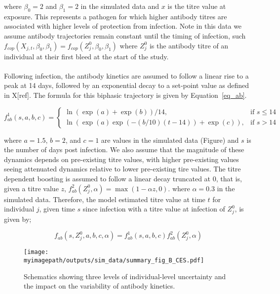 where $\beta_0 = 2$ and $\beta_1 = 2$ in the simulated data and $x$ is the titre value at exposure. This represents a pathogen for which higher antibody titres are associated with higher levels of protection from infection. Note in this data we assume antibody trajectories remain constant until the timing of infection, such $f_{cop}(X_{j, t}, \beta_0, \beta_1) = f_{cop}(Z^0_{j}, \beta_0, \beta_1)$ where $Z^0_{j}$ is the antibody titre of an individual at their first bleed at the start of the study.

\paragraph{}Following infection, the antibody kinetics are assumed to follow a linear rise to a peak at 14 days, followed by an exponential decay to a set-point value as defined in X[ref]. The formula for this biphasic trajectory is given by Equation~\ref{eq_ab}.

\begin{equation}
\label{eq_ab}
f^1_{ab}(s, a, b, c) =
\begin{cases}
  \ln(\exp(a) + \exp(b)) / 14, & \text{if }s \leq 14 \\
  \ln(\exp(a) \exp(-(b/10)(t - 14)) + \exp(c)), &\text{if } s > 14
\end{cases}
\end{equation}

where $a = 1.5$, $b = 2$, and $c = 1$ are values in the simulated data (Figure) and $s$ is the number of days post infection. We also assume that the magnitude of these dynamics depends on pre-existing titre values, with higher pre-existing values seeing attenuated dynamics relative to lower pre-existing tire values. The titre dependent boosting is assumed to follow a linear decay truncated at 0, that is, given a titre value $z$, $f^2_{ab}(Z_j^0, \alpha) = \max(1 - \alpha z, 0)$. where $\alpha = 0.3$ in the simulated data. Therefore, the model estimated titre value at time $t$ for individual $j$, given time $s$ since infection with a titre value at infection of $Z_{j}^0$, is given by;  

\begin{equation}
\label{eq_ab2}
f_{ab}(s, Z^0_{j}, a, b, c, \alpha) = f^1_{ab}(s, a, b, c)f^2_{ab}(Z^0_{j}, \alpha) 
\end{equation}


\begin{figure}[h]
    \centering
    \texttt{[image: \\myimagepath/outputs/sim\_data/summary\_fig\_B\_CES.pdf]}     \caption{Schematics showing three levels of individual-level uncertainty and the impact on the variability of antibody kinetics.   }
    \label{fig:sim_B}
\end{figure}



